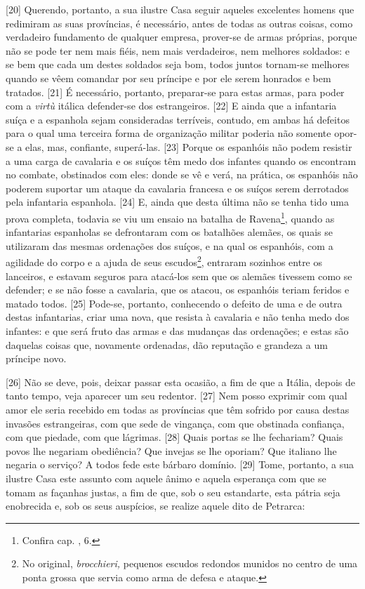 {[}20{]} Querendo, portanto, a sua ilustre Casa seguir aqueles
excelentes homens que redimiram as suas províncias, é necessário, antes
de todas as outras coisas, como verdadeiro fundamento de qualquer
empresa, prover-se de armas próprias, porque não se pode ter nem mais
fiéis, nem mais verdadeiros, nem melhores soldados: e se bem que cada um
destes soldados seja bom, todos juntos tornam-se melhores quando se vêem
comandar por seu príncipe e por ele serem honrados e bem tratados.
{[}21{]} É necessário, portanto, preparar-se para estas armas, para
poder com a \emph{virtù} itálica defender-se dos estrangeiros. {[}22{]}
E ainda que a infantaria suíça e a espanhola sejam consideradas
terríveis, contudo, em ambas há defeitos para o qual uma terceira forma
de organização militar poderia não somente opor-se a elas, mas,
confiante, superá-las. {[}23{]} Porque os espanhóis não podem resistir a
uma carga de cavalaria e os suíços têm medo dos infantes quando os
encontram no combate, obstinados com eles: donde se vê e verá, na
prática, os espanhóis não poderem suportar um ataque da cavalaria
francesa e os suíços serem derrotados pela infantaria espanhola.
{[}24{]} E, ainda que desta última não se tenha tido uma prova completa,
todavia se viu um ensaio na batalha de Ravena\footnote{Confira cap. ,
  6.}, quando as infantarias espanholas se defrontaram com os batalhões
alemães, os quais se utilizaram das mesmas ordenações dos suíços, e na
qual os espanhóis, com a agilidade do corpo e a ajuda de seus
escudos\footnote{No original, \emph{brocchieri,} pequenos escudos
  redondos munidos no centro de uma ponta grossa que servia como arma de
  defesa e ataque.}, entraram sozinhos entre os lanceiros, e estavam
seguros para atacá-los sem que os alemães tivessem como se defender; e
se não fosse a cavalaria, que os atacou, os espanhóis teriam feridos e
matado todos. {[}25{]} Pode-se, portanto, conhecendo o defeito de uma e
de outra destas infantarias, criar uma nova, que resista à cavalaria e
não tenha medo dos infantes: e que será fruto das armas e das mudanças
das ordenações; e estas são daquelas coisas que, novamente ordenadas,
dão reputação e grandeza a um príncipe novo.

{[}26{]} Não se deve, pois, deixar passar esta ocasião, a fim de que a
Itália, depois de tanto tempo, veja aparecer um seu redentor. {[}27{]}
Nem posso exprimir com qual amor ele seria recebido em todas as
províncias que têm sofrido por causa destas invasões estrangeiras, com
que sede de vingança, com que obstinada confiança, com que piedade, com
que lágrimas. {[}28{]} Quais portas se lhe fechariam? Quais povos lhe
negariam obediência? Que invejas se lhe oporiam? Que italiano lhe
negaria o serviço? A todos fede este bárbaro domínio. {[}29{]} Tome,
portanto, a sua ilustre Casa este assunto com aquele ânimo e aquela
esperança com que se tomam as façanhas justas, a fim de que, sob o seu
estandarte, esta pátria seja enobrecida e, sob os seus auspícios, se
realize aquele dito de Petrarca:

